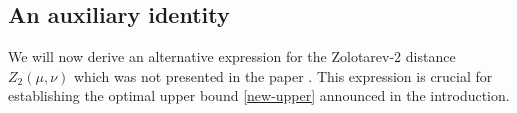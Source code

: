 \documentclass[11pt,reqno]{amsart}
\theoremstyle{definition}
\numberwithin{equation}{section}
\newcommand{\blue}{\textcolor{blue}}
\begin{document}
\subsection{An auxiliary identity}  We will now derive an alternative expression for the Zolotarev-2 distance $Z_2(\mu,\nu)$ which was not presented in the paper \cite{bolbou2024}. This expression is crucial for establishing the optimal upper bound
 \eqref{new-upper} announced in the introduction.  
 
 
\end{document}

